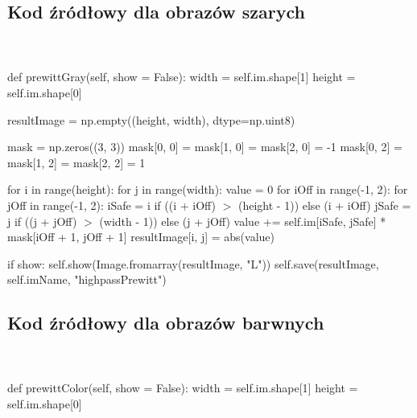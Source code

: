 \documentclass[final,a4paper,openany,12pt]{mwbk}
\begin{document}
\subsection*{Kod źródłowy dla obrazów szarych}
\hfill
\\\\
\noindent def prewittGray(self, show = False): \newline
\indent width = self.im.shape[1] \newline
\indent height = self.im.shape[0] \newline

resultImage = np.empty((height, width), dtype=np.uint8) \newline

mask = np.zeros((3, 3)) \newline
\indent mask[0, 0] = mask[1, 0] = mask[2, 0] = -1 \newline
\indent mask[0, 2] = mask[1, 2] = mask[2, 2] = 1 \newline

for i in range(height): \newline
\indent for j in range(width): \newline
\indent value = 0 \newline
\indent for iOff in range(-1, 2): \newline
\indent for jOff in range(-1, 2): \newline
\indent iSafe = i if ((i + iOff) $>$ (height - 1)) else (i + iOff) \newline
\indent jSafe = j if ((j + jOff) $>$ (width - 1)) else (j + jOff) \newline
\indent value += self.im[iSafe, jSafe] * mask[iOff + 1, jOff + 1] \newline
\indent resultImage[i, j] = abs(value) \newline

if show: \newline
\indent self.show(Image.fromarray(resultImage, "L")) \newline
\indent self.save(resultImage, self.imName, "highpassPrewitt") \newline
\newpage

\subsection*{Kod źródłowy dla obrazów barwnych}
\hfill
\\\\
\noindent def prewittColor(self, show = False): \newline
\indent width = self.im.shape[1] \newline
\indent height = self.im.shape[0] \newline
\end{document}
